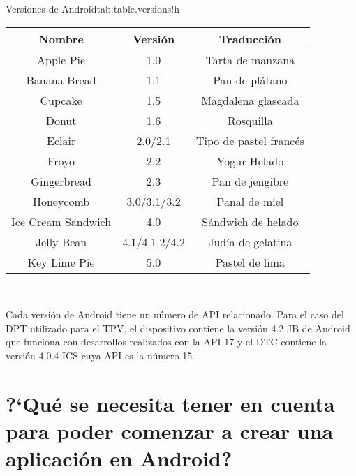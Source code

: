 \begin{tablaob}{Versiones de Android}{tab:table.versions}{!h}
     \begin{tabular}{|c|c|c|}
          \hline
          \textbf{Nombre}&\textbf{Versi\'on}&\textbf{Traducci\'on}\\
          \hline\hline
           Apple Pie & 1.0 & Tarta de manzana\\\hline
           Banana Bread & 1.1 & Pan de pl\'atano\\\hline
           Cupcake & 1.5 & Magdalena glaseada\\\hline
           Donut & 1.6 & Rosquilla\\\hline
           Eclair & 2.0/2.1 & Tipo de pastel franc\'es\\\hline
           Froyo & 2.2 & Yogur Helado\\\hline
           Gingerbread & 2.3 & Pan de jengibre \\\hline
           Honeycomb & 3.0/3.1/3.2 & Panal de miel\\\hline
           Ice Cream Sandwich & 4.0 & S\'andwich de helado\\\hline
           Jelly Bean & 4.1/4.1.2/4.2 & Jud\'ia de gelatina\\\hline
           Key Lime Pie & 5.0 & Pastel de lima\\\hline
     \end{tabular}\\[5mm]
\end{tablaob}



Cada versi\'on de Android tiene un n\'umero de \ac{API} relacionado. Para el caso del \ac{DPT} utilizado para el \ac{TPV}, el dispositivo contiene la versi\'on 4.2 \ac{JB} de Android que funciona con desarrollos realizados con la \ac{API} 17 y el \ac{DTC} contiene la versi\'on 4.0.4 \ac{ICS} cuya \ac{API} es la n\'umero 15.


\section{?`Qu\'e se necesita tener en cuenta para poder comenzar a crear una aplicaci\'on en Android?}
\label{sec:android.whatYouNeed.1}


